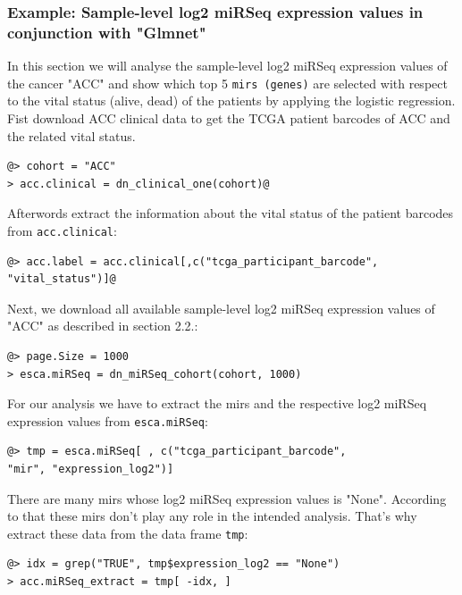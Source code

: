 \documentclass[a4paper,12pt,listof=totoc,bibliography=totoc]{scrartcl}
\begin{document}
\subsubsection{Example: Sample-level log2 miRSeq expression values in conjunction with "Glmnet"}
In this section we will analyse the sample-level log2 miRSeq expression values of the cancer "ACC" and show which top 5
{\tt mirs (genes)} are selected with respect to the vital status (alive, dead) of the patients by applying the logistic 
regression.\\
Fist download ACC clinical data to get the TCGA patient barcodes of ACC and the related vital status.
\begin{lstlisting}[style=base]
@> cohort = "ACC"
> acc.clinical = dn_clinical_one(cohort)@
\end{lstlisting}
Afterwords extract the information about the vital status of the patient barcodes from {\tt acc.clinical}:
\begin{lstlisting}[style=base]
@> acc.label = acc.clinical[,c("tcga_participant_barcode",
"vital_status")]@
\end{lstlisting}
Next, we download all available sample-level log2 miRSeq expression values of "ACC" as described in section 2.2.:
\begin{lstlisting}[style=base]
@> page.Size = 1000
> esca.miRSeq = dn_miRSeq_cohort(cohort, 1000)
\end{lstlisting}
For our analysis we have to extract the mirs and the respective log2 miRSeq expression values from {\tt esca.miRSeq}:
\begin{lstlisting}[style=base]
@> tmp = esca.miRSeq[ , c("tcga_participant_barcode", 
"mir", "expression_log2")]
\end{lstlisting}
There are many mirs whose log2 miRSeq expression values is "None". According to that these mirs don't play any role in the
intended analysis. That's why extract these data from the data frame {\tt tmp}:
\begin{lstlisting}[style=base]
@> idx = grep("TRUE", tmp$expression_log2 == "None")
> acc.miRSeq_extract = tmp[ -idx, ]
\end{lstlisting}

 
 
 
 
 
 
\end{document}
